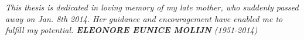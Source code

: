 \chapter*{}

\bigskip
\bigskip
\bigskip
\bigskip

\begin{center}
\emph{This thesis is dedicated in loving memory of my late mother, who suddenly passed away on Jan. 8th 2014. Her guidance and encouragement have enabled me to fulfill my potential.
\linebreak
\linebreak
\linebreak
\textbf{ELEONORE EUNICE MOLIJN }
\linebreak
(1951-2014)
}
\end{center}
